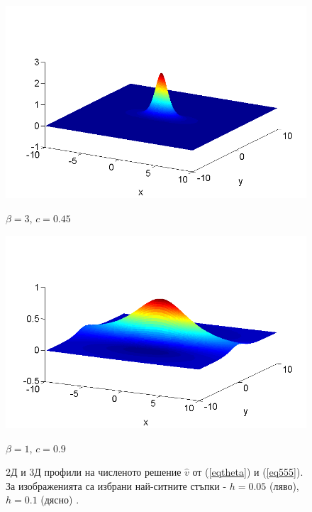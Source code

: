 \documentclass{article}
\newcommand{\rf}[1]{(\ref{#1})}
\begin{document}
\begin{figure}[ht]
\begin{minipage}[b]{0.5\linewidth}
		\includegraphics[width=\linewidth]{SolutionView/ChristovIC_30_bt3_c045_prpview.png}		
		\centerline{$\beta = 3$, $c = 0.45$ }
	\end{minipage}
	\begin{minipage}[b]{0.5\linewidth}
		 \raggedright
		\includegraphics[width=\linewidth]{SolutionView/ChristovIC_128_bt1_c090_prpview.png}
		\centerline{$\beta = 1$, $c = 0.9$}
	\end{minipage}
	\caption{2Д и 3Д профили на численото решение $\widehat v$ от \rf{eqtheta} и \rf{eq555}. За изображенията са избрани най-ситните стъпки - $h=0.05$ (ляво), $h=0.1$ (дясно) .}
	\label{fig:solutions}
\end{figure}
\end{document}
